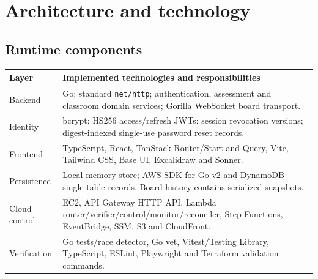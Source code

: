 \documentclass[11pt,a4paper]{article}
\begin{document}
\section{Architecture and technology}
\subsection{Runtime components}
\begin{tabularx}{\textwidth}{@{}P{29mm}X@{}}\toprule Layer & Implemented technologies and responsibilities \\\midrule
Backend & Go; standard \texttt{net/http}; authentication, assessment and classroom domain services; Gorilla WebSocket board transport. \\
Identity & bcrypt; HS256 access/refresh JWTs; session revocation versions; digest-indexed single-use password reset records. \\
Frontend & TypeScript, React, TanStack Router/Start and Query, Vite, Tailwind CSS, Base UI, Excalidraw and Sonner. \\
Persistence & Local memory store; AWS SDK for Go v2 and DynamoDB single-table records. Board history contains serialized snapshots. \\
Cloud control & EC2, API Gateway HTTP API, Lambda router/verifier/control/monitor/reconciler, Step Functions, EventBridge, SSM, S3 and CloudFront. \\
Verification & Go tests/race detector, Go vet, Vitest/Testing Library, TypeScript, ESLint, Playwright and Terraform validation commands. \\\bottomrule\end{tabularx}
\end{document}
